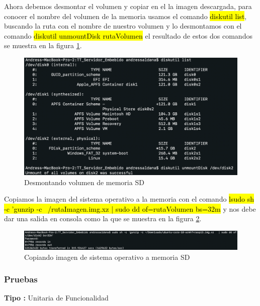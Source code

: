 Ahora debemos desmontar el volumen y copiar en el la imagen descargada, para conocer el nombre del volumen de la memoria usamos el comando \hl{diskutil list}, buscando la ruta con el nombre de nuestro volumen y lo desmontamos con el comando \hl{diskutil unmountDisk rutaVolumen} el resultado de estos dos comandos se muestra en la figura \ref{fig:desmonataje}.

\begin{figure}[H]
	\centering
	\includegraphics[scale=.4]{Capitulo5/images/unmount.png}
	\caption{Desmontando volumen de memoria SD}
	\label{fig:desmonataje}
\end{figure} 

Copiamos la imagen del sistema operativo a la memoria con el comando \hl{lsudo sh -c 'gunzip -c ~/rutaImagen.img.xz   | sudo dd of=rutaVolumen bs=32m} y nos debe dar una salida en consola como la que se muestra en la figura \ref{fig:copia}.

\begin{figure}[H]
	\centering
	\includegraphics[scale=.3]{Capitulo5/images/copyimg.png}
	\caption{Copiando imagen de sistema operativo a memoria SD}
	\label{fig:copia}
\end{figure} 

\subsubsection{Pruebas}
\textbf{Tipo :} Unitaria de Funcionalidad \\ \newline

